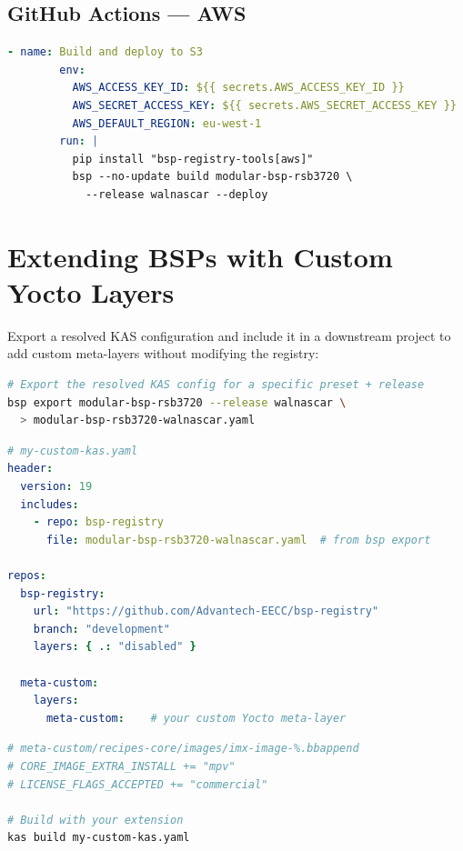 \documentclass[a4paper,11pt]{article}
\begin{document}
\subsection{GitHub Actions --- AWS}

\begin{lstlisting}[language=YAML]
      - name: Build and deploy to S3
        env:
          AWS_ACCESS_KEY_ID: ${{ secrets.AWS_ACCESS_KEY_ID }}
          AWS_SECRET_ACCESS_KEY: ${{ secrets.AWS_SECRET_ACCESS_KEY }}
          AWS_DEFAULT_REGION: eu-west-1
        run: |
          pip install "bsp-registry-tools[aws]"
          bsp --no-update build modular-bsp-rsb3720 \
            --release walnascar --deploy
\end{lstlisting}

\section{Extending BSPs with Custom Yocto Layers}

Export a resolved KAS configuration and include it in a downstream project to
add custom meta-layers without modifying the registry:

\begin{lstlisting}[language=Bash]
# Export the resolved KAS config for a specific preset + release
bsp export modular-bsp-rsb3720 --release walnascar \
  > modular-bsp-rsb3720-walnascar.yaml
\end{lstlisting}

\begin{lstlisting}[language=YAML]
# my-custom-kas.yaml
header:
  version: 19
  includes:
    - repo: bsp-registry
      file: modular-bsp-rsb3720-walnascar.yaml  # from bsp export

repos:
  bsp-registry:
    url: "https://github.com/Advantech-EECC/bsp-registry"
    branch: "development"
    layers: { .: "disabled" }

  meta-custom:
    layers:
      meta-custom:    # your custom Yocto meta-layer
\end{lstlisting}

\begin{lstlisting}[language=Bash]
# meta-custom/recipes-core/images/imx-image-%.bbappend
# CORE_IMAGE_EXTRA_INSTALL += "mpv"
# LICENSE_FLAGS_ACCEPTED += "commercial"

# Build with your extension
kas build my-custom-kas.yaml
\end{lstlisting}
\end{document}
